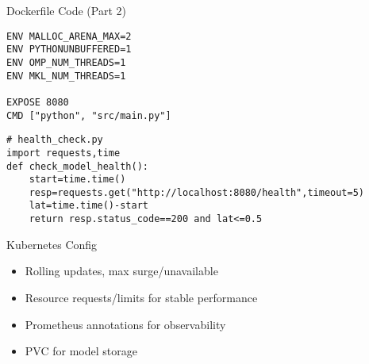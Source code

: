\documentclass[aspectratio=169]{beamer}
\begin{document}

\begin{frame}[fragile]{Dockerfile Code (Part 2)}
\begin{verbatim}
ENV MALLOC_ARENA_MAX=2
ENV PYTHONUNBUFFERED=1
ENV OMP_NUM_THREADS=1
ENV MKL_NUM_THREADS=1

EXPOSE 8080
CMD ["python", "src/main.py"]
\end{verbatim}

\begin{verbatim}
# health_check.py
import requests,time
def check_model_health():
    start=time.time()
    resp=requests.get("http://localhost:8080/health",timeout=5)
    lat=time.time()-start
    return resp.status_code==200 and lat<=0.5
\end{verbatim}
\end{frame}



\begin{frame}{Kubernetes Config}


\begin{itemize}
\item Rolling updates, max surge/unavailable
\item Resource requests/limits for stable performance
\item Prometheus annotations for observability
\item PVC for model storage
\end{itemize}
\end{frame}
\end{document}
